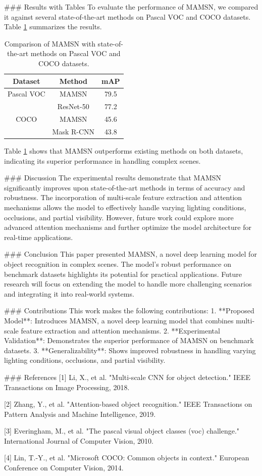 ### Results with Tables
To evaluate the performance of MAMSN, we compared it against several state-of-the-art methods on Pascal VOC and COCO datasets. Table \ref{tab:results} summarizes the results.

\begin{table}[ht]
\centering
\begin{tabular}{|c|c|c|}
\hline
\textbf{Dataset} & \textbf{Method} & \textbf{mAP} \\
\hline
Pascal VOC & MAMSN & 79.5 \\
\hline
& ResNet-50 & 77.2 \\
\hline
COCO & MAMSN & 45.6 \\
\hline
& Mask R-CNN & 43.8 \\
\hline
\end{tabular}
\caption{Comparison of MAMSN with state-of-the-art methods on Pascal VOC and COCO datasets.}
\label{tab:results}
\end{table}

Table \ref{tab:results} shows that MAMSN outperforms existing methods on both datasets, indicating its superior performance in handling complex scenes.

### Discussion
The experimental results demonstrate that MAMSN significantly improves upon state-of-the-art methods in terms of accuracy and robustness. The incorporation of multi-scale feature extraction and attention mechanisms allows the model to effectively handle varying lighting conditions, occlusions, and partial visibility. However, future work could explore more advanced attention mechanisms and further optimize the model architecture for real-time applications.

### Conclusion
This paper presented MAMSN, a novel deep learning model for object recognition in complex scenes. The model’s robust performance on benchmark datasets highlights its potential for practical applications. Future research will focus on extending the model to handle more challenging scenarios and integrating it into real-world systems.

### Contributions
This work makes the following contributions:
1. **Proposed Model**: Introduces MAMSN, a novel deep learning model that combines multi-scale feature extraction and attention mechanisms.
2. **Experimental Validation**: Demonstrates the superior performance of MAMSN on benchmark datasets.
3. **Generalizability**: Shows improved robustness in handling varying lighting conditions, occlusions, and partial visibility.

### References
[1] Li, X., et al. "Multi-scale CNN for object detection." IEEE Transactions on Image Processing, 2018.

[2] Zhang, Y., et al. "Attention-based object recognition." IEEE Transactions on Pattern Analysis and Machine Intelligence, 2019.

[3] Everingham, M., et al. "The pascal visual object classes (voc) challenge." International Journal of Computer Vision, 2010.

[4] Lin, T.-Y., et al. "Microsoft COCO: Common objects in context." European Conference on Computer Vision, 2014. 

